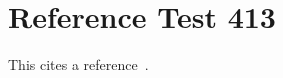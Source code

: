 \documentclass{article}
\begin{document}
\section{Reference Test 413}
This cites a reference~\cite{test413}.

\end{document}
